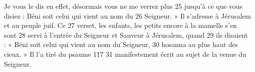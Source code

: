  Je vous le dis en effet, désormais vous ne me verrez plus	 
25	 	jusqu'à ce que vous disiez : Béni soit celui qui vient au nom du	 
26	 	Seigneur. » Il s'adresse à Jérusalem et au peuple juif. Ce	 
27	 	verset, les enfants, les petits encore à la mamelle s'en sont	 
28	 	servi à l'entrée du Seigneur et Sauveur à Jérusalem, quand	 
29	 	ils disaient : « Béni soit celui qui vient au nom du Seigneur,	 
30	 	hosanna au plus haut des cieux. » Il l'a tiré du psaume 117	 
31	 	manifestement écrit au sujet de la venue du Seigneur.